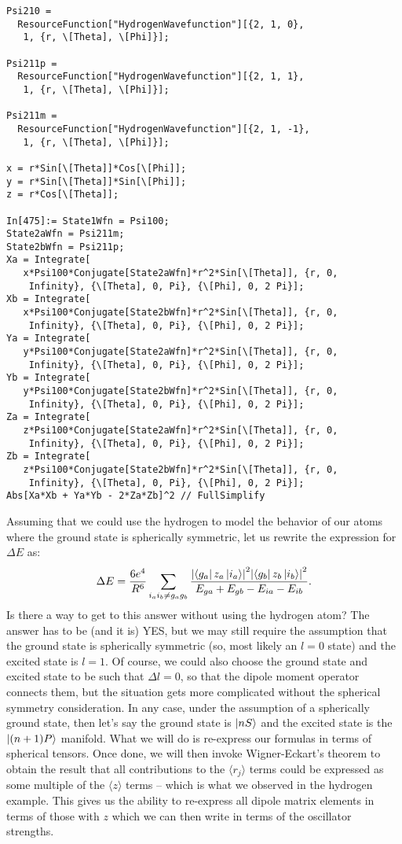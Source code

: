 \documentclass{article}
\theoremstyle{definition}
\newcommand{\f}[2]{\frac{#1}{#2}}
\begin{document}
\begin{enumerate}[label=(\alph*)]
\begin{lstlisting}
Psi210 = 
  ResourceFunction["HydrogenWavefunction"][{2, 1, 0}, 
   1, {r, \[Theta], \[Phi]}];

Psi211p = 
  ResourceFunction["HydrogenWavefunction"][{2, 1, 1}, 
   1, {r, \[Theta], \[Phi]}];

Psi211m = 
  ResourceFunction["HydrogenWavefunction"][{2, 1, -1}, 
   1, {r, \[Theta], \[Phi]}];

x = r*Sin[\[Theta]]*Cos[\[Phi]];
y = r*Sin[\[Theta]]*Sin[\[Phi]];
z = r*Cos[\[Theta]];

In[475]:= State1Wfn = Psi100;
State2aWfn = Psi211m;
State2bWfn = Psi211p;
Xa = Integrate[
   x*Psi100*Conjugate[State2aWfn]*r^2*Sin[\[Theta]], {r, 0, 
    Infinity}, {\[Theta], 0, Pi}, {\[Phi], 0, 2 Pi}];
Xb = Integrate[
   x*Psi100*Conjugate[State2bWfn]*r^2*Sin[\[Theta]], {r, 0, 
    Infinity}, {\[Theta], 0, Pi}, {\[Phi], 0, 2 Pi}];
Ya = Integrate[
   y*Psi100*Conjugate[State2aWfn]*r^2*Sin[\[Theta]], {r, 0, 
    Infinity}, {\[Theta], 0, Pi}, {\[Phi], 0, 2 Pi}];
Yb = Integrate[
   y*Psi100*Conjugate[State2bWfn]*r^2*Sin[\[Theta]], {r, 0, 
    Infinity}, {\[Theta], 0, Pi}, {\[Phi], 0, 2 Pi}];
Za = Integrate[
   z*Psi100*Conjugate[State2aWfn]*r^2*Sin[\[Theta]], {r, 0, 
    Infinity}, {\[Theta], 0, Pi}, {\[Phi], 0, 2 Pi}];
Zb = Integrate[
   z*Psi100*Conjugate[State2bWfn]*r^2*Sin[\[Theta]], {r, 0, 
    Infinity}, {\[Theta], 0, Pi}, {\[Phi], 0, 2 Pi}];
Abs[Xa*Xb + Ya*Yb - 2*Za*Zb]^2 // FullSimplify
\end{lstlisting}

Assuming that we could use the hydrogen to model the behavior of our atoms where the ground state is spherically symmetric, let us rewrite the expression for $\Delta E$ as:
\begin{align*}
\Delta E = \f{6e^4}{R^6} \sum_{i_ai_b \neq g_a g_b} \f{  \abs{\bra{g_a} z_a \ket{i_a}}^2  \abs{\bra{g_b} z_b \ket{i_b}}^2 }{E_{ga} + E_{gb} - E_{ia} - E_{ib}}.
\end{align*}
Is there a way to get to this answer without using the hydrogen atom? The answer has to be (and it is) YES, but we may still require the assumption that the ground state is spherically symmetric (so, most likely an $l=0$ state) and the excited state is $l=1$. Of course, we could also choose the ground state and excited state to be such that $\Delta l = 0$, so that the dipole moment operator connects them, but the situation gets more complicated without the spherical symmetry consideration. In any case, under the assumption of a spherically ground state, then let's say the ground state is $\ket{nS}$ and the excited state is the $\ket{(n+1)P}$ manifold. What we will do is re-express our formulas in terms of spherical tensors. Once done, we will then invoke Wigner-Eckart's theorem to obtain the result that all contributions to the $\langle r_j \rangle$ terms could be expressed as some multiple of the $\langle z \rangle$ terms -- which is what we observed in the hydrogen example. This gives us the ability to re-express all dipole matrix elements in terms of those with $z$ which we can then write in terms of the oscillator strengths.  


\end{enumerate}
\end{document}
